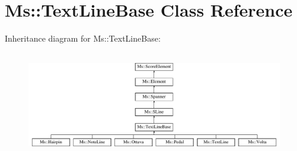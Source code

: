 \hypertarget{class_ms_1_1_text_line_base}{}\section{Ms\+:\+:Text\+Line\+Base Class Reference}
\label{class_ms_1_1_text_line_base}
Inheritance diagram for Ms\+:\+:Text\+Line\+Base\+:\begin{figure}[H]
\begin{center}
\leavevmode
\includegraphics[height=4.628099cm]{class_ms_1_1_text_line_base}
\end{center}
\end{figure}
